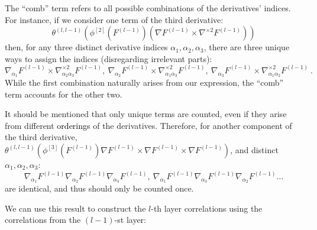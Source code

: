 \documentclass{article} %
\begin{document}
The ``comb'' term refers to all possible combinations of the derivatives' indices. For instance, if we consider one term of the third derivative:
\begin{equation}
\theta^{\left(l,l-1\right)}\left(\phi^{\left[2\right]}\left(F^{(l-1)}\right)\left(\nabla F^{(l-1)}\times\nabla^{\times2}F^{(l-1)}\right)\right) 
\end{equation}
then, for any three distinct derivative indices \(\alpha_1,\alpha_2,\alpha_3\), there are three unique ways to assign the indices (disregarding irrelevant parts):
\begin{equation}
\nabla_{\alpha_{1}}F^{(l-1)}\times\nabla_{\alpha_{2}\alpha_{3}}^{\times2}F^{(l-1)},\ 
\nabla_{\alpha_{2}}F^{(l-1)}\times\nabla_{\alpha_{1}\alpha_{3}}^{\times2}F^{(l-1)},\ 
\nabla_{\alpha_{3}}F^{(l-1)}\times\nabla_{\alpha_{1}\alpha_{2}}^{\times2}F^{(l-1)} \ .
\end{equation}
While the first combination naturally arises from our expression, the ``comb'' term accounts for the other two.

It should be mentioned that only unique terms are counted, even if they arise from different \textcolor{black}{orderings} of the derivatives. Therefore, for another component of the third derivative,
\(\theta^{\left(l,l-1\right)}\left(\phi^{\left[3\right]}\left(F^{(l-1)}\right)\nabla F^{(l-1)}\times\nabla F^{(l-1)}\times\nabla F^{(l-1)}\right)\),
and distinct \(\alpha_1,\alpha_2,\alpha_3\):
\begin{equation}
\nabla_{\alpha_{1}}F^{(l-1)}\nabla_{\alpha_{2}}F^{(l-1)}\nabla_{\alpha_{3}}F^{(l-1)},\ 
\nabla_{\alpha_{1}}F^{(l-1)}\nabla_{\alpha_{3}}F^{(l-1)}\nabla_{\alpha_{2}}F^{(l-1)}\ldots
\end{equation}
are identical, and thus should only be counted once.

We can use this result to construct the \(l\)-th layer correlations using the correlations from the \((l-1)\)-st layer:
\end{document}
